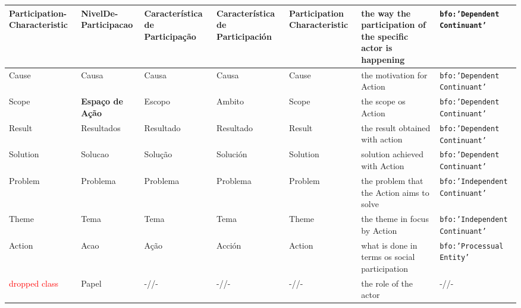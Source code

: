 \documentclass[10pt,letterpaper]{article}
\begin{document}
\begin{table}[!h]
\begin{adjustwidth}{-2.25in}{0in}
\begin{tabular}{|p{1.8cm}|p{1.6cm}||p{2.2cm}|p{2.2cm}|p{1.8cm}||p{4cm}||p{3cm}|}
Participation-Characteristic & NivelDe-Participacao & Caracter\'istica de Participa\c{c}\~ao & Caracter\'istica de Participaci\'on & Participation Characteristic & the way the participation of the specific actor is happening & {\tt bfo:'Dependent Continuant'} \\\hline
Cause & Causa & Causa & Causa &  Cause & the motivation for Action & {\tt bfo:'Dependent Continuant'} \\\hline
      Scope &{\bf Espa\c{c}o de A\c{c}\~ao} & Escopo & Ambito & Scope & the scope os Action & {\tt bfo:'Dependent Continuant'} \\\hline
Result & Resultados & Resultado & Resultado & Result & the result obtained with action & {\tt bfo:'Dependent Continuant'} \\\hline
      Solution & Solucao & Solu\c{c}\~ao & Soluci\'on & Solution & solution achieved with Action & {\tt bfo:'Dependent Continuant'} \\\hline \hline
      Problem & Problema & Problema & Problema & Problem & the problem that the Action aims to solve & {\tt bfo:'Independent Continuant'} \\\hline
Theme & Tema & Tema & Tema & Theme & the theme in focus by Action & {\tt bfo:'Independent Continuant'} \\\hline \hline
Action & Acao & A\c{c}\~ao & Acci\'on & Action & what is done in terms os social participation & {\tt bfo:'Processual Entity'} \\\hline\hline
\textcolor{red}{dropped class} & Papel & -//-  & -//- & -//- & the role of the actor & -//- \\ \hline
  \end{tabular}
  \label{ospClasses}
\end{adjustwidth}
\end{table}
\end{document}
